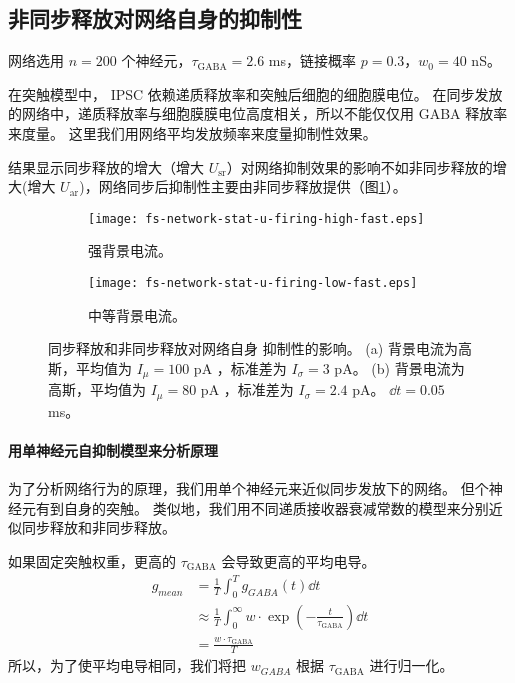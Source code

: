 \subsection{非同步释放对网络自身的抑制性}
\label{section:result:network-self-inhibition}
网络选用 $n = 200$ 个神经元，$\tau_\text{GABA} = 2.6$ ms，链接概率 $p = 0.3$，$w_0 = 40$ nS。

在突触模型中， IPSC 依赖递质释放率和突触后细胞的细胞膜电位。
在同步发放的网络中，递质释放率与细胞膜膜电位高度相关，所以不能仅仅用 GABA 释放率来度量。
这里我们用网络平均发放频率来度量抑制性效果。

结果显示同步释放的增大（增大 $U_\text{sr}$）对网络抑制效果的影响不如非同步释放的增大(增大 $U_\text{ar}$)，网络同步后抑制性主要由非同步释放提供（图\ref{figure:network-recurrent-inhibition}）。

\begin{figure}
    \begin{subfigure}{0.5\textwidth}
        \texttt{[image: fs-network-stat-u-firing-high-fast.eps]}
        \caption{强背景电流。}
    \end{subfigure}
    \begin{subfigure}{0.5\textwidth}
        \texttt{[image: fs-network-stat-u-firing-low-fast.eps]}
        \caption{中等背景电流。}
    \end{subfigure}
\caption{同步释放和非同步释放对网络自身 抑制性的影响。
(a) 背景电流为高斯，平均值为 $I_{\mu} = 100$ pA ，标准差为 $I_{\sigma} = 3$ pA。
(b) 背景电流为高斯，平均值为 $I_{\mu} = 80$ pA ，标准差为 $I_{\sigma} = 2.4$ pA。
$\dd{t} = 0.05$ ms。}
\label{figure:network-recurrent-inhibition}
\end{figure}

\paragraph{用单神经元自抑制模型来分析原理}
为了分析网络行为的原理，我们用单个神经元来近似同步发放下的网络。
但个神经元有到自身的突触。
类似地，我们用不同递质接收器衰减常数的模型来分别近似同步释放和非同步释放。

如果固定突触权重，更高的 $\tau_\text{GABA}$ 会导致更高的平均电导。
\begin{equation}
\begin{split}
g_{mean} &= \frac{1}{T} \int_{0}^{T} {g_{GABA}\left(t\right)\dd{t}} \\
& \approx \frac{1}{T} \int_{0}^{\infty} {w \cdot \exp\left(-\frac{t}{\tau_\text{GABA}}\right)\dd{t}} \\
&= \frac{w\cdot \tau_\text{GABA}}{T}
\end{split}
\end{equation}
所以，为了使平均电导相同，我们将把 $w_{GABA}$ 根据 $\tau_\text{GABA}$ 进行归一化。

